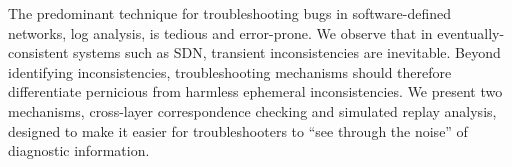 The predominant technique for troubleshooting bugs in software-defined networks,
log analysis, is tedious and error-prone. We observe that
in eventually-consistent systems such as SDN,
transient inconsistencies are inevitable. Beyond identifying inconsistencies,
troubleshooting mechanisms should therefore differentiate
pernicious from harmless ephemeral inconsistencies. We present two
mechanisms, cross-layer correspondence checking and simulated replay analysis, 
designed to make it easier for troubleshooters to ``see through the noise'' of
diagnostic information.
